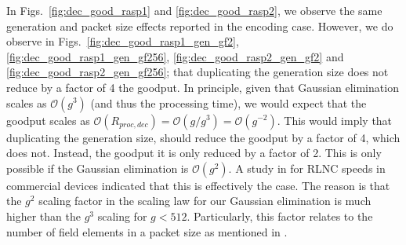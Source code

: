 In Figs.~\ref{fig:dec_good_rasp1} and \ref{fig:dec_good_rasp2}, we
observe the same generation and packet size effects reported in the
encoding case. However, we do observe in
Figs.~\ref{fig:dec_good_rasp1_gen_gf2}, \ref{fig:dec_good_rasp1_gen_gf256},
\ref{fig:dec_good_rasp2_gen_gf2} and \ref{fig:dec_good_rasp2_gen_gf256};
that duplicating the generation size does not reduce by a factor of 4 the
goodput. In principle, given that Gaussian elimination scales as
$\mathcal{O}(g^3)$ (and thus the processing time), we would expect that
the goodput scales as $\mathcal{O}(R_{proc,dec}) = \mathcal{O}(g/g^{3}) =
\mathcal{O}(g^{-2})$. This would imply that duplicating the generation
size, should reduce the goodput by a factor of 4, which does not. Instead,
the goodput it is only reduced by a factor of 2. This is only possible if
the Gaussian elimination is $\mathcal{O}(g^2)$. A study in
\cite{paramanathan2013leanandmean} for \ac{RLNC} speeds in commercial
devices indicated that this is effectively the case. The reason is that
the $g^2$ scaling factor in the scaling law for our Gaussian elimination is much
higher than the $g^3$ scaling for $g < 512$. Particularly, this factor
relates to the number of field elements in a packet size as mentioned
in \cite{paramanathan2013leanandmean}.


